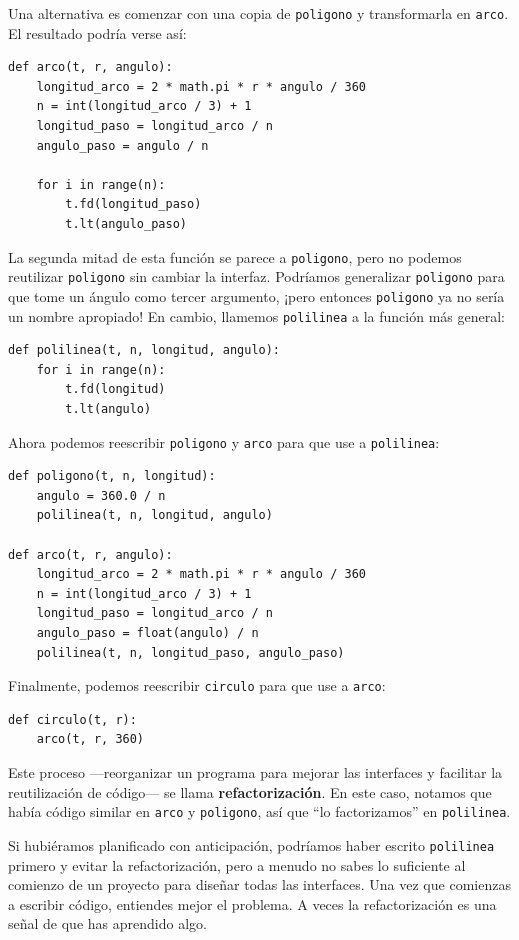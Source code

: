 \documentclass[10pt]{book}
\begin{document}
Una alternativa es comenzar con una copia
de {\tt poligono} y transformarla en {\tt arco}.  El resultado
podría verse así:

\begin{verbatim}
def arco(t, r, angulo):
    longitud_arco = 2 * math.pi * r * angulo / 360
    n = int(longitud_arco / 3) + 1
    longitud_paso = longitud_arco / n
    angulo_paso = angulo / n

    for i in range(n):
        t.fd(longitud_paso)
        t.lt(angulo_paso)
\end{verbatim}
%
La segunda mitad de esta función se parece a {\tt poligono}, pero
no podemos reutilizar {\tt poligono} sin cambiar la interfaz.  Podríamos
generalizar {\tt poligono} para que tome un ángulo como tercer argumento,
¡pero entonces {\tt poligono} ya no sería un nombre apropiado!
En cambio, llamemos {\tt polilinea} a la función más general: 

\begin{verbatim}
def polilinea(t, n, longitud, angulo):
    for i in range(n):
        t.fd(longitud)
        t.lt(angulo)
\end{verbatim}
%
Ahora podemos reescribir {\tt poligono} y {\tt arco} para que use a {\tt polilinea}:

\begin{verbatim}
def poligono(t, n, longitud):
    angulo = 360.0 / n
    polilinea(t, n, longitud, angulo)

def arco(t, r, angulo):
    longitud_arco = 2 * math.pi * r * angulo / 360
    n = int(longitud_arco / 3) + 1
    longitud_paso = longitud_arco / n
    angulo_paso = float(angulo) / n
    polilinea(t, n, longitud_paso, angulo_paso)
\end{verbatim}
%
Finalmente, podemos reescribir {\tt circulo} para que use a {\tt arco}:

\begin{verbatim}
def circulo(t, r):
    arco(t, r, 360)
\end{verbatim}
%
Este proceso ---reorganizar un programa para mejorar
las interfaces y facilitar la reutilización de código--- se llama {\bf refactorización}.
En este caso, notamos que había código similar en {\tt arco} y
{\tt poligono}, así que ``lo factorizamos'' en {\tt polilinea}.

Si hubiéramos planificado con anticipación, podríamos haber escrito {\tt polilinea} primero
y evitar la refactorización, pero a menudo no sabes lo suficiente al
comienzo de un proyecto para diseñar todas las interfaces.  Una vez que comienzas
a escribir código, entiendes mejor el problema.  A veces la refactorización es una
señal de que has aprendido algo.
\end{document}
